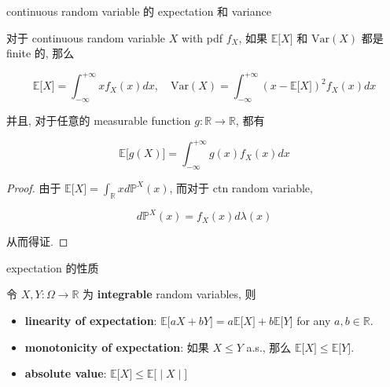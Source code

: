 \documentclass{qlnotes-export}
\begin{document}
\begin{proposition}{continuous random variable 的 expectation 和 variance}\label{prop-02-random-variables-continuous-random-variable-expectation-variance}

对于 continuous random variable \(X\) with pdf \(f_{X}\), 如果 \({\mathbb{E}}\lbrack X\rbrack\) 和 \(\text{Var}(X)\) 都是 finite 的, 那么

\[{\mathbb{E}}\lbrack X\rbrack = \int_{- \infty}^{+ \infty}xf_{X}(x) dx,\quad\text{Var}(X) = \int_{- \infty}^{+ \infty}(x - {\mathbb{E}}\lbrack X\rbrack)^{2}f_{X}(x) dx\]

并且, 对于任意的 measurable function \(g:{\mathbb{R}}\rightarrow{\mathbb{R}}\), 都有

\[{\mathbb{E}}\lbrack g(X)\rbrack = \int_{- \infty}^{+ \infty}g(x)f_{X}(x) dx\]

\end{proposition}

\begin{proof}

由于 \({\mathbb{E}}\lbrack X\rbrack = \int_{\mathbb{R}}x d{\mathbb{P}}^{X}(x)\), 而对于 ctn random variable,

\[d{\mathbb{P}}^{X}(x) = f_{X}(x) d\lambda(x)\]

从而得证.

\end{proof}

\begin{proposition}{expectation 的性质}\label{prop-02-random-variables-expectation}

令 \(X,Y:\Omega\rightarrow{\mathbb{R}}\) 为 \textbf{integrable} random variables, 则

\begin{itemize}
\item
  \textbf{linearity of expectation}: \({\mathbb{E}}\lbrack aX + bY\rbrack = a{\mathbb{E}}\lbrack X\rbrack + b{\mathbb{E}}\lbrack Y\rbrack\) for any \(a,b \in {\mathbb{R}}\).
\item
  \textbf{monotonicity of expectation}: 如果 \(X \leq Y\) a.s., 那么 \({\mathbb{E}}\lbrack X\rbrack \leq {\mathbb{E}}\lbrack Y\rbrack\).
\item
  \textbf{absolute value}: \(\left. {\mathbb{E}}\lbrack X\rbrack \leq {\mathbb{E}}\lbrack \middle| X \middle| \rbrack \right.\)
\end{itemize}

\end{proposition}
\end{document}
